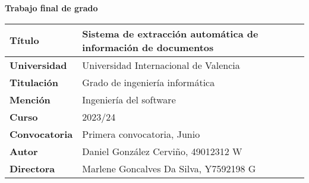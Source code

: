 \noindent
\Huge\textbf{Trabajo final de grado}
\normalfont\normalsize
\vspace{3em}
\begin{table}[h]
    \renewcommand{\arraystretch}{1.5}
    \begin{tabular}{p{} p{}}
        \hline\textbf{Título}             & Sistema de extracción automática de información de documentos \\
        \hline\textbf{Universidad}  & Universidad Internacional de Valencia                         \\
        \hline\textbf{Titulación}   & Grado de ingeniería informática                               \\
        \hline\textbf{Mención}      & Ingeniería del software                                       \\
        \hline\textbf{Curso}        & 2023/24                                                       \\
        \hline\textbf{Convocatoria} & Primera convocatoria, Junio                                   \\
        \hline\textbf{Autor}        & Daniel González Cerviño, 49012312 W                           \\
        \hline\textbf{Directora}    & Marlene Goncalves Da Silva, Y7592198 G                        \\
        \hline
    \end{tabular}
    \label{tab:}
\end{table}
